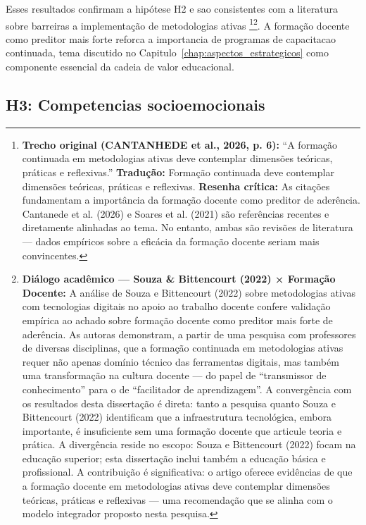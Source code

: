 Esses resultados confirmam a hipótese H2 e sao consistentes com a literatura sobre barreiras a implementação de metodologias ativas \cite{CANTANHEDE2026, SOARES2021, SOUZA2022}\footnote{\textbf{Trecho original (CANTANHEDE et al., 2026, p. 6):} ``A formação continuada em metodologias ativas deve contemplar dimensões teóricas, práticas e reflexivas.'' \textbf{Tradução:} Formação continuada deve contemplar dimensões teóricas, práticas e reflexivas. \textbf{Resenha crítica:} As citações fundamentam a importância da formação docente como preditor de aderência. Cantanede et al. (2026) e Soares et al. (2021) são referências recentes e diretamente alinhadas ao tema. No entanto, ambas são revisões de literatura — dados empíricos sobre a eficácia da formação docente seriam mais convincentes.}\footnote{\textbf{Diálogo acadêmico — Souza \& Bittencourt (2022) × Formação Docente:} A análise de Souza e Bittencourt (2022) sobre metodologias ativas com tecnologias digitais no apoio ao trabalho docente confere validação empírica ao achado sobre formação docente como preditor mais forte de aderência. As autoras demonstram, a partir de uma pesquisa com professores de diversas disciplinas, que a formação continuada em metodologias ativas requer não apenas domínio técnico das ferramentas digitais, mas também uma transformação na cultura docente — do papel de ``transmissor de conhecimento'' para o de ``facilitador de aprendizagem''. A convergência com os resultados desta dissertação é direta: tanto a pesquisa quanto Souza e Bittencourt (2022) identificam que a infraestrutura tecnológica, embora importante, é insuficiente sem uma formação docente que articule teoria e prática. A divergência reside no escopo: Souza e Bittencourt (2022) focam na educação superior; esta dissertação inclui também a educação básica e profissional. A contribuição é significativa: o artigo oferece evidências de que a formação docente em metodologias ativas deve contemplar dimensões teóricas, práticas e reflexivas — uma recomendação que se alinha com o modelo integrador proposto nesta pesquisa.}. A formação docente como preditor mais forte reforca a importancia de programas de capacitacao continuada, tema discutido no Capitulo~\ref{chap:aspectos_estrategicos} como componente essencial da cadeia de valor educacional.

\subsection{H3: Competencias socioemocionais}
\label{subsec:h3_competências}


